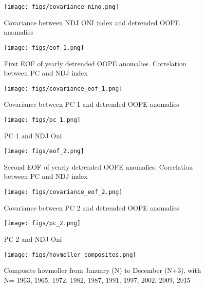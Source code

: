 \newpage

\begin{figure}[h!]
\centering
    \texttt{[image: figs/covariance\_nino.png]}
    \caption{Covariance between NDJ ONI index and detrended OOPE anomalies}
\end{figure}

\begin{figure}[h!]
\centering
    \texttt{[image: figs/eof\_1.png]}
    \caption{First EOF of yearly detrended OOPE anomalies. Correlation between PC and NDJ index}
\end{figure}

\begin{figure}[h!]
\centering
    \texttt{[image: figs/covariance\_eof\_1.png]}
    \caption{Covariance between PC 1 and detrended OOPE anomalies}
\end{figure}

\begin{figure}[h!]
    \texttt{[image: figs/pc\_1.png]}
    \caption{PC 1 and NDJ Oni}
\end{figure}

\begin{figure}[h!]
\centering
    \texttt{[image: figs/eof\_2.png]}
    \caption{Second EOF of yearly detrended OOPE anomalies. Correlation between PC and NDJ index}
\end{figure}

\begin{figure}[h!]
\centering
    \texttt{[image: figs/covariance\_eof\_2.png]}
    \caption{Covariance between PC 2 and detrended OOPE anomalies}
\end{figure}

\begin{figure}[h!]
\centering
    \texttt{[image: figs/pc\_2.png]}
    \caption{PC 2 and NDJ Oni}
\end{figure}


\begin{figure}[h!]
\centering
    \texttt{[image: figs/hovmoller\_composites.png]}
    \caption{Composite hovmoller from January (N) to December (N+3), with N= 1963, 1965, 1972, 1982, 1987, 1991, 1997, 2002, 2009, 2015}
\end{figure}


